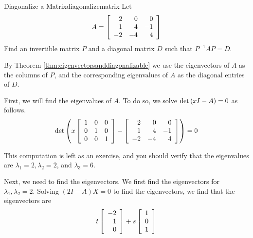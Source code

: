 \begin{example}{Diagonalize a Matrix}{diagonalizematrix}
Let 
\begin{equation*}
A=\left[
\begin{array}{rrr}
2 & 0 & 0 \\
1 & 4 & -1 \\
-2 & -4 & 4
\end{array}
\right] 
\end{equation*}
 Find an invertible matrix $P$ and a diagonal matrix $D$ such that $P^{-1}AP=D$.
\end{example}

\begin{solution}
By Theorem \ref{thm:eigenvectorsanddiagonalizable} we use the eigenvectors of $A$ as the columns of $P$, and
the corresponding eigenvalues of $A$ as the diagonal entries of $D$. 

First, we will find the eigenvalues of $A$. To do so, we solve $\det \left( x I -A \right) =0$ as follows.
\begin{equation*}
\det
\left(
x
\left[
\begin{array}{rrr}
1 & 0 & 0 \\
0 & 1 & 0 \\
0 & 0 & 1
\end{array}
\right]
-
\left[
\begin{array}{rrr}
2 & 0 & 0 \\
1 & 4 & -1 \\
-2 & -4 & 4
\end{array}
\right]
\right)
=
0
\end{equation*}

This computation is left as an exercise, and you should verify that the eigenvalues are $\lambda_1 =2,
\lambda_2 = 2$, and $\lambda_3 = 6$.

Next, we need to find the eigenvectors. We first find the eigenvectors for $\lambda_1, \lambda_2 = 2$. 
Solving $\left(2I - A \right)X = 0$ to find the eigenvectors, we find that the
eigenvectors are
\begin{equation*}
t\left[
\begin{array}{r}
-2 \\
1 \\
0
\end{array}
\right] +s\left[
\begin{array}{r}
1 \\
0 \\
1
\end{array}
\right]
\end{equation*}


\end{solution}
